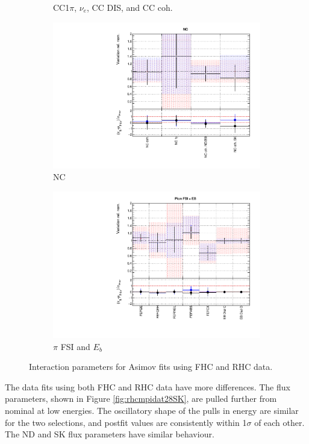 \begin{figure}[t]
\begin{subfigure}{0.49\textwidth}
  \caption{CC1$\pi$, $\nu_e$, CC DIS, and CC coh.}
  \label{fig:}
\end{subfigure}
\begin{subfigure}{0.49\textwidth}
  \centering
  \includegraphics[width=0.95\linewidth]{figs/rhcmpasmvxsec3}
  \caption{NC}
  \label{fig:}
\end{subfigure}
\begin{subfigure}{0.49\textwidth}
  \centering
  \includegraphics[width=0.95\linewidth]{figs/rhcmpasmvxsec4}
  \caption{$\pi$ FSI and $E_b$}
  \label{fig:}
\end{subfigure}
\caption{Interaction parameters for Asimov fits using FHC and RHC data.}
\label{fig:rhcmpiasmvxsec}
\end{figure}

The data fits using both FHC and RHC data have more differences. The flux parameters, shown in Figure \ref{fig:rhcmpidat28SK}, are pulled further from nominal at low energies. The oscillatory shape of the pulls in energy are similar for the two selections, and postfit values are consistently within 1$\sigma$ of each other. The ND and SK flux parameters have similar behaviour.
 
